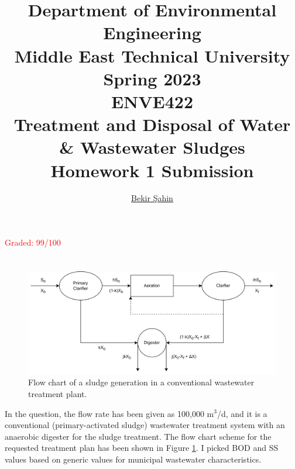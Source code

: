 \documentclass[a4paper]{article}
\title{Department of Environmental Engineering\\Middle East Technical University\\Spring 2023\\ENVE422\\Treatment and Disposal of Water \& Wastewater Sludges\\Homework 1 Submission} %
\author{\href{sahin.bekir@metu.edu.tr}{Bekir Şahin}} %
\begin{document}
\setcounter{page}{0}
\onehalfspacing
\maketitle %
\thispagestyle{empty}
\begin{center}
    \huge \textcolor{red}{Graded: 99/100}
\end{center}
\newpage
\section{} %
\begin{figure}[h]
    \centering
    \includegraphics[scale=0.75]{SludgeQuantities.png}
    \caption{Flow chart of a sludge generation in a conventional wastewater treatment plant.}
    \label{fig:SludgeQuantities}
\end{figure}
\begin{minipage}[c]{0.5\textwidth}
In the question, the flow rate has been given as 100,000 m$^3$/d, and it is a conventional (primary-activated sludge) wastewater treatment system with an anaerobic digester for the sludge treatment. The flow chart scheme for the requested treatment plan has been shown in Figure \ref{fig:SludgeQuantities}. I picked BOD and SS values based on generic values for municipal wastewater characteristics\autocite{sanin2011,vesilind1988,metcalf2014}.
\end{minipage}
\hfill
\begin{minipage}{0.4\textwidth}
\end{minipage}
\end{document}
